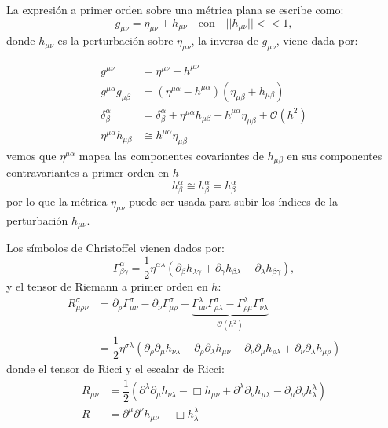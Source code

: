 \documentclass[../main]{subfiles}
\begin{document}
La expresión a primer orden sobre una métrica plana se escribe como:
\begin{equation}
    g_{\mu\nu}=\eta_{\mu\nu}+h_{\mu\nu} \quad \text{con} \quad ||h_{\mu\nu}|| << 1,
\end{equation}
donde $h_{\mu\nu}$ es la perturbación sobre $\eta_{\mu\nu}$, la inversa de $g_{\mu\nu}$, viene dada por:
\begin{adjustwidth}{0pt}{-100pt}
\begin{equation}
    \begin{split}
        g^{\mu\nu}&=\eta^{\mu\nu}-h^{\mu\nu} \\
        g^{\mu\alpha}g_{\mu\beta}&=(\eta^{\mu\alpha}-h^{\mu\alpha})(\eta_{\mu\beta}+h_{\mu\beta}) \\
        \delta^{\alpha}_{\beta}&=\delta^{\alpha}_{\beta}+\eta^{\mu\alpha} h_{\mu\beta}-h^{\mu\alpha}\eta_{\mu\beta}+\mathcal{O}(h^2)\\
        \eta^{\mu\alpha}h_{\mu\beta} &\cong h^{\mu\alpha}\eta_{\mu\beta}
    \end{split}
\end{equation}
vemos que $\eta^{\mu\alpha}$ mapea las componentes covariantes de $h_{\mu\beta}$ en sus componentes contravariantes a primer orden en $h$ 
\begin{equation}
    h^{\alpha}_{\beta} \cong h^{\alpha}_{\beta}=h^{\alpha}_{\beta}
\end{equation}
por lo que la métrica $\eta_{\mu\nu}$ puede ser usada para subir los índices de la perturbación $h_{\mu\nu}$.

Los símbolos de Christoffel vienen dados por:
\begin{equation}
    \Gamma^{\alpha}_{\beta\gamma}=\dfrac{1}{2}\eta^{\alpha\lambda}(\partial_{\beta}h_{\lambda\gamma}+\partial_{\gamma}h_{\beta\lambda}-\partial_{\lambda}h_{\beta\gamma}),
\end{equation}
y el tensor de Riemann a primer orden en $h$:
\begin{equation}
    \begin{split}
        R^{\sigma}_{\mu\rho\nu}&=\partial_{\rho} \Gamma^{\sigma}_{\mu\nu}-\partial_{\nu}\Gamma^{\sigma}_{\mu\rho}+\underbrace{\Gamma^{\lambda}_{\mu\nu}\Gamma^{\sigma}_{\rho\lambda}-\Gamma^{\lambda}_{\rho\mu}\Gamma^{\sigma}_{\nu\lambda}}_{\mathcal{O}(h^2)} \\
        &=\dfrac{1}{2}\eta^{\sigma\lambda}(\partial_{\rho}\partial_{\mu}h_{\nu\lambda}-\partial_{\rho}\partial_{\lambda}h_{\mu\nu}-\partial_{\nu}\partial_{\mu}h_{\rho\lambda}+\partial_{\nu}\partial_{\lambda}h_{\mu\rho})
    \end{split}
\end{equation}
donde el tensor de Ricci y el escalar de Ricci:
\begin{align}
    R_{\mu\nu}&=\dfrac{1}{2}(\partial^{\lambda}\partial_{\mu}h_{\nu\lambda}-\Box h_{\mu\nu}+\partial^{\lambda}\partial_{\nu}h_{\mu\lambda}-\partial_{\mu}\partial_{\nu}h^{\lambda}_{\lambda})\\
    R&=\partial^{\mu}\partial^{\nu}h_{\mu\nu}-\Box h^{\lambda}_{\lambda}
\end{align}


\end{adjustwidth}
\end{document}
